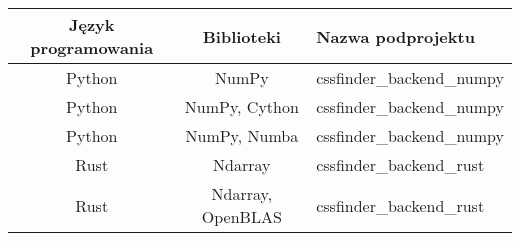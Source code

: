 \begin{tabularx}{\textwidth}{c|c|l}
  \hline \textbf{Język programowania} & \textbf{Biblioteki}      & \textbf{Nazwa podprojektu} \\ \hline
   Python                             & NumPy                    & cssfinder\_backend\_numpy \\
   Python                             & NumPy, Cython            & cssfinder\_backend\_numpy \\
   Python                             & NumPy, Numba             & cssfinder\_backend\_numpy \\
   Rust                               & Ndarray                  & cssfinder\_backend\_rust \\
   Rust                               & Ndarray, OpenBLAS        & cssfinder\_backend\_rust \\ \hline
\end{tabularx}